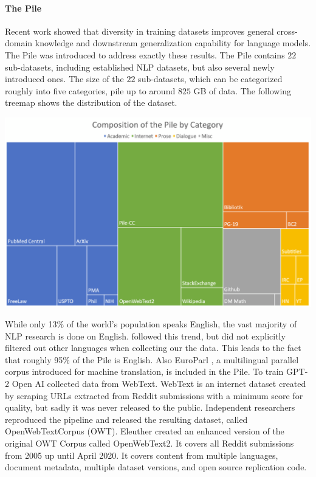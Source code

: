 \documentclass[
]{krantz}
\begin{document}
\hypertarget{the-pile}{%
\paragraph{The Pile}\label{the-pile}}

Recent work \citep{rosset2020turing} showed that diversity in training datasets improves general cross-domain knowledge and downstream generalization capability for language models. The Pile \citep{gao2020pile} was introduced to address exactly these results. The Pile contains \(22\) sub-datasets, including established NLP datasets, but also several newly introduced ones. The size of the \(22\) sub-datasets, which can be categorized roughly into five categories, pile up to around \(825\) GB of data.
The following treemap shows the distribution of the dataset.

\includegraphics{figures/01-chapter1/thePile.png}

While only 13\% of the world's population speaks English, the vast majority of NLP research is done on English. \citet{gao2020pile} followed this trend, but did not explicitly filtered out other languages when collecting our the data. This leads to the fact that roughly 95\% of the Pile is English. Also EuroParl \citep{koehn2005europarl}, a multilingual parallel corpus introduced for machine translation, is included in the Pile. To train GPT-2 Open AI collected data from WebText. WebText is an internet dataset created by scraping URLs extracted from Reddit submissions with a minimum score for quality, but sadly it was never released to the public. Independent researchers reproduced the pipeline and released the resulting dataset, called OpenWebTextCorpus \citep{Gokaslan2019OpenWeb} (OWT). Eleuther created an enhanced version of the original OWT Corpus called OpenWebText2. It covers all Reddit submissions from 2005 up until April 2020. It covers content from multiple languages, document metadata, multiple dataset versions, and open source replication code.
\end{document}
